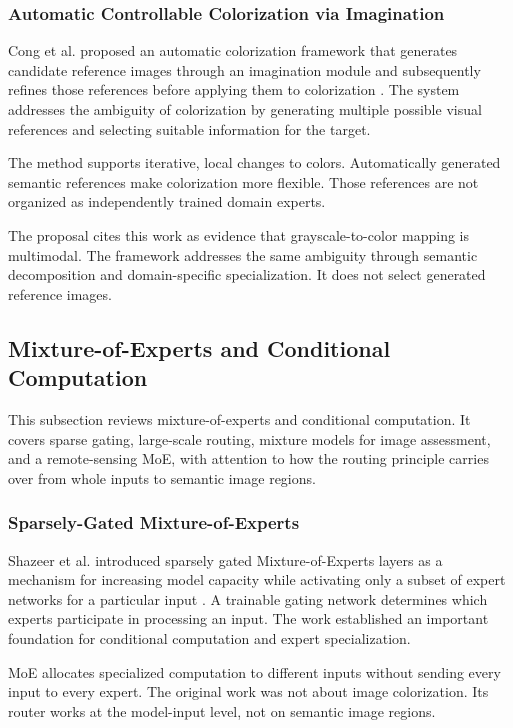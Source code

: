 \documentclass{FastFyp}
\begin{document}
\subsubsection{Automatic Controllable Colorization via Imagination}

Cong et al. proposed an automatic colorization framework that generates candidate reference images through an imagination module and subsequently refines those references before applying them to colorization \cite{ref11}. The system addresses the ambiguity of colorization by generating multiple possible visual references and selecting suitable information for the target.

The method supports iterative, local changes to colors. Automatically generated semantic references make colorization more flexible. Those references are not organized as independently trained domain experts.

The proposal cites this work as evidence that grayscale-to-color mapping is multimodal. The framework addresses the same ambiguity through semantic decomposition and domain-specific specialization. It does not select generated reference images.

\subsection{Mixture-of-Experts and Conditional Computation}

This subsection reviews mixture-of-experts and conditional computation. It covers sparse gating, large-scale routing, mixture models for image assessment, and a remote-sensing MoE, with attention to how the routing principle carries over from whole inputs to semantic image regions.

\subsubsection{Sparsely-Gated Mixture-of-Experts}

Shazeer et al. introduced sparsely gated Mixture-of-Experts layers as a mechanism for increasing model capacity while activating only a subset of expert networks for a particular input \cite{ref12}. A trainable gating network determines which experts participate in processing an input. The work established an important foundation for conditional computation and expert specialization.

MoE allocates specialized computation to different inputs without sending every input to every expert. The original work was not about image colorization. Its router works at the model-input level, not on semantic image regions.
\end{document}
